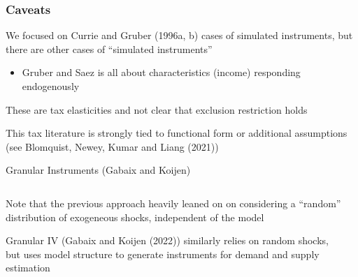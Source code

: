 \documentclass[notes,11pt, aspectratio=169]{beamer}
\newenvironment{wideitemize}{\itemize\addtolength{\itemsep}{10pt}}{\enditemize}
\begin{document}
\begin{frame}
\frametitle{Caveats}

\begin{wideitemize}
\item   We focused on Currie and Gruber (1996a, b) cases of simulated instruments, but there are other cases of ``simulated instruments'' 
\begin{itemize}
\item Gruber and Saez is all about characteristics (income) responding endogenously
\end{itemize}
\item These are tax elasticities and not clear that exclusion restriction holds
\item This tax literature is strongly tied to functional form or additional assumptions (see Blomquist, Newey, Kumar and Liang (2021))
\end{wideitemize}
\end{frame}

\begin{frame}{Granular Instruments (Gabaix and Koijen)}
\begin{columns}[T] %
\begin{column}{.5\textwidth}
  \begin{wideitemize}
  \item Note that the previous approach heavily leaned on on
    considering a ``random'' distribution of exogeneous shocks,
    independent of the model
  \item Granular IV (Gabaix and Koijen (2022)) similarly relies on
    random shocks, but uses model structure to generate instruments
    for demand and supply estimation
  \end{wideitemize}
\end{column}%
\hfill%
\begin{column}{.5\textwidth}
\end{column}%
\end{columns}
\end{frame}
\end{document}
